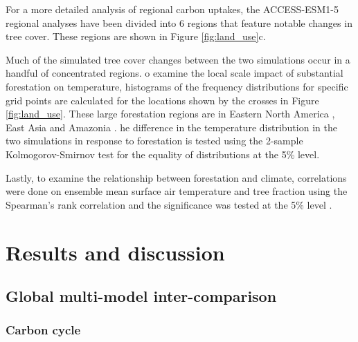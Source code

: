\documentclass[draft]{agujournal2019}
\begin{document}
For a more detailed analysis of regional carbon uptakes, the ACCESS-ESM1-5 regional analyses have been divided into 6 regions that feature notable changes in tree cover.
These regions are shown in Figure \ref{fig:land_use}c.

Much of the simulated tree cover changes between the two simulations occur in a handful of concentrated regions.
o examine the local scale impact of substantial forestation on temperature, histograms of the frequency distributions for specific grid points are calculated for the locations shown by the crosses in Figure \ref{fig:land_use}.
These large forestation regions are in Eastern North America , East Asia  and Amazonia .
he difference in the temperature distribution in the two simulations in response to forestation is tested using the 2-sample Kolmogorov-Smirnov test for the equality of distributions at the 5\% level.

Lastly, to examine the relationship between forestation and climate, correlations were done on ensemble mean surface air temperature and tree fraction using the Spearman's rank correlation and the significance was tested at the 5\% level \cite{kokoska2000crc}.

\section{Results and discussion}

\subsection{Global multi-model inter-comparison}

\subsubsection{Carbon cycle}
\end{document}
